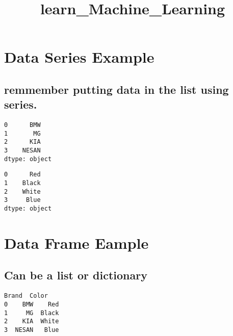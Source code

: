 \documentclass[11pt]{article}
\title{learn\_Machine\_Learning}
\begin{document}
    
    \maketitle
    
    

    
    \hypertarget{data-series-example}{%
\section{\texorpdfstring{\textbf{Data Series
Example}}{Data Series Example}}\label{data-series-example}}

\hypertarget{remmember-putting-data-in-the-list-using-series.}{%
\subsection{\texorpdfstring{\textbf{remmember putting data in the list
using
series.}}{remmember putting data in the list using series.}}\label{remmember-putting-data-in-the-list-using-series.}}

    \begin{Verbatim}[commandchars=\\\{\}]
0      BMW
1       MG
2      KIA
3    NESAN
dtype: object
    \end{Verbatim}

            \begin{tcolorbox}[breakable, size=fbox, boxrule=.5pt, pad at break*=1mm, opacityfill=0]
\begin{Verbatim}[commandchars=\\\{\}]
0      Red
1    Black
2    White
3     Blue
dtype: object
\end{Verbatim}
\end{tcolorbox}
        
    \hypertarget{data-frame-eample}{%
\section{\texorpdfstring{\textbf{Data Frame
Eample}}{Data Frame Eample}}\label{data-frame-eample}}

\hypertarget{can-be-a-list-or-dictionary}{%
\subsection{\texorpdfstring{\textbf{Can be a list or
dictionary}}{Can be a list or dictionary}}\label{can-be-a-list-or-dictionary}}

            \begin{tcolorbox}[breakable, size=fbox, boxrule=.5pt, pad at break*=1mm, opacityfill=0]
\begin{Verbatim}[commandchars=\\\{\}]
   Brand  Color
0    BMW    Red
1     MG  Black
2    KIA  White
3  NESAN   Blue
\end{Verbatim}
\end{tcolorbox}
        
\end{document}
